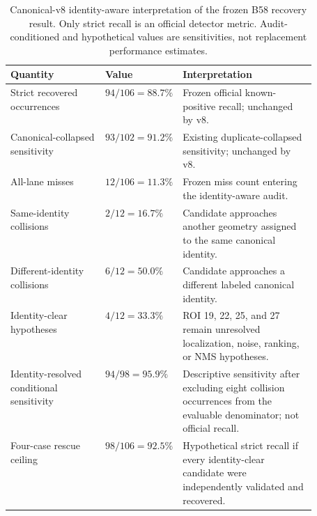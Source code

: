 \begin{table}[!htbp]
\centering
\caption{Canonical-v8 identity-aware interpretation of the frozen B58 recovery
result. Only strict recall is an official detector metric. Audit-conditioned
and hypothetical values are sensitivities, not replacement performance
estimates.}
\label{tab:identity-aware-v8}
\small
\begin{tabularx}{\linewidth}{>{\raggedright\arraybackslash}p{0.31\linewidth} >{\raggedright\arraybackslash}p{0.20\linewidth} X}
\toprule
Quantity & Value & Interpretation \\
\midrule
Strict recovered occurrences & $94/106=88.7\%$ & Frozen official known-positive recall; unchanged by v8. \\
Canonical-collapsed sensitivity & $93/102=91.2\%$ & Existing duplicate-collapsed sensitivity; unchanged by v8. \\
All-lane misses & $12/106=11.3\%$ & Frozen miss count entering the identity-aware audit. \\
Same-identity collisions & $2/12=16.7\%$ & Candidate approaches another geometry assigned to the same canonical identity. \\
Different-identity collisions & $6/12=50.0\%$ & Candidate approaches a different labeled canonical identity. \\
Identity-clear hypotheses & $4/12=33.3\%$ & ROI 19, 22, 25, and 27 remain unresolved localization, noise, ranking, or NMS hypotheses. \\
Identity-resolved conditional sensitivity & $94/98=95.9\%$ & Descriptive sensitivity after excluding eight collision occurrences from the evaluable denominator; not official recall. \\
Four-case rescue ceiling & $98/106=92.5\%$ & Hypothetical strict recall if every identity-clear candidate were independently validated and recovered. \\
\bottomrule
\end{tabularx}
\end{table}
